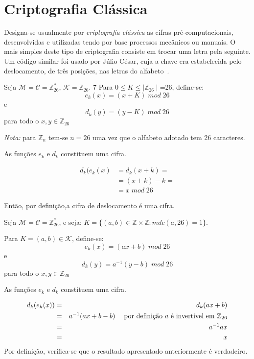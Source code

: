 \chapter{Criptografia Clássica}

Designa-se usualmente por \emph{criptografia clássica} as cifras  pré-computacionais, desenvolvidas e utilizadas tendo por base processos mecânicos ou manuais. O mais simples deste tipo de criptografia consiste em trocar uma letra pela seguinte. Um código similar foi usado por Júlio César, cuja a chave era estabelecida pelo deslocamento, de três posições, nas letras do alfabeto~\cite{Coutinho2005}.

\begin{definicao}
 Seja $\mathcal{M}=\mathcal{C}=\mathbb{Z}_{26}^*$, $\mathcal{K}=\mathbb{Z}_{26}$. 7
 Para $0 \leq K \leq \mid\mathbb{Z}_{26}\mid$=26, define-se:
$$e_k(x)=(x+K) \; mod \; 26$$ e $$d_k(y)=(y - K) \; mod \; 26$$ para todo o $x,y \in \mathbb{Z}_{26}$
\end{definicao}

\emph{Nota:} para $\mathbb{Z}_{n}$ tem-se $n=26$ uma vez que o alfabeto adotado tem 26 caracteres.

\begin{teorema} As funções $e_k$ e $d_k$ constituem uma cifra.
\end{teorema}
\begin{demonstracao}
    \begin{align*}
    d_k(e_k(x)&=d_k(x+k)=\\
              &=(x+k)-k=\\
              &=x\;mod\;26
\end{align*}

Então, por definição,a cifra de deslocamento é uma cifra.
\end{demonstracao}


\begin{definicao}
    Seja $\mathcal{M}=\mathcal{C}=\mathbb{Z}_{26}^*$, e seja:
$K=\{(a,b) \in \mathbb{Z}\times \mathbb{Z} : mdc(a,26)=1\}$.

Para $K=(a,b) \in \mathcal{K}$, define-se:
$$ e_k(x)=(ax + b)\;mod\;26$$
e
$$ d_k(y)=a^{-1}(y - b)\;mod\;26$$
para todo o $x,y \in \mathbb{Z}_{26}$
\end{definicao}

\begin{teorema} As funções $e_k$ e $d_k$ constituem uma cifra.
\end{teorema}
\begin{demonstracao}
    \begin{eqnarray*}
    d_k(e_k(x)) & = & d_k(ax +b)\\
                & = & a^{-1}(ax+b -b)\quad\text{\;por definição $a$ é invertível em $\mathbb{Z}_{26}$}\\
                & = & a^{-1}ax\\
                & = & x
    \end{eqnarray*} 
Por definição, verifica-se que o resultado apresentado anteriormente é verdadeiro.
\end{demonstracao}


